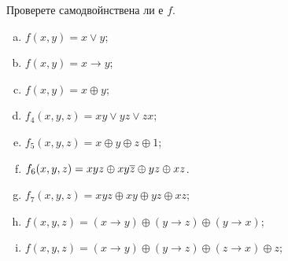 \begin{problem}
  Проверете самодвойнствена ли е $f$.
  \begin{enumerate}[a)]
  \item
    $f(x,y) = x\vee y$;
  \item
    $f(x,y) = x\rightarrow y$;
  \item
    $f(x,y) = x\oplus y$;
  \item
    $f_4(x,y,z) = xy\vee yz\vee zx$;
  \item
    $f_5(x,y,z) = x\oplus y\oplus z\oplus 1$;
  \item
    $f_6(x,y,z) = xyz\oplus xy\overline{z}\oplus yz\oplus xz$.
  \item
    $f_7(x,y,z) = xyz\oplus xy\oplus yz\oplus xz$;
  \item
    $f(x,y,z) = (x\rightarrow y)\oplus (y\rightarrow z)\oplus (y\rightarrow x)$;
  \item
    $f(x,y,z) = (x\rightarrow y)\oplus (y\rightarrow z)\oplus (z\rightarrow x)\oplus z$;
  \end{enumerate}
\end{problem}
